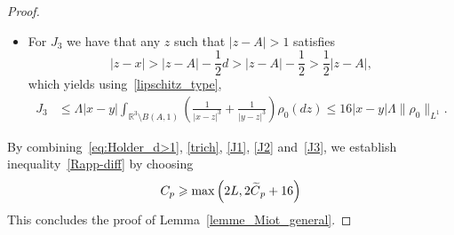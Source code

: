 \documentclass[AHL,Unicode,longabstracts,published]{cedram}
\newcommand{\R}{\mathbb{R}}
\renewcommand{\leq}{\leqslant}
\renewcommand{\geq}{\geqslant}
\let\oldtilde\tilde
\renewcommand*{\tilde}[1]{\mathchoice{\widetilde{#1}}{\widetilde{#1}}{\oldtilde{#1}}{\oldtilde{#1}}}
\begin{document}
\begin{proof}
\begin{itemize}
\item For $J_3$ we have that any $z$ such that $|z-A|>1$ satisfies
\[
|z-x|>|z-A|- \frac{1}{2} d>|z-A|- \frac{1}{2} > \frac{1}{2} |z-A|,
\]
which yields using~\eqref{lipschitz_type},
\begin{align}\label{J3}
J_3 &\leq \Lambda |x-y| \int_{\R^3\setminus B(A,1)}\left(\frac{1}{|x-z|^3}+\frac{1}{|y-z|^3} \right)\rho_0(dz)\leq 16|x-y|\Lambda \|\rho_0\|_{L^1}.
\end{align}
\end{itemize}
By combining~\eqref{eq:Holder_d>1}, \eqref{trich}, \eqref{J1}, \eqref{J2} and~\eqref{J3}, we establish inequality~\eqref{Rapp-diff} by choosing
\[
C_p \geq \max\left(2L, 2\tilde{C}_p+16\right)
\]
This concludes the proof of Lemma~\ref{lemme_Miot_general}.
\end{proof}
\end{document}
